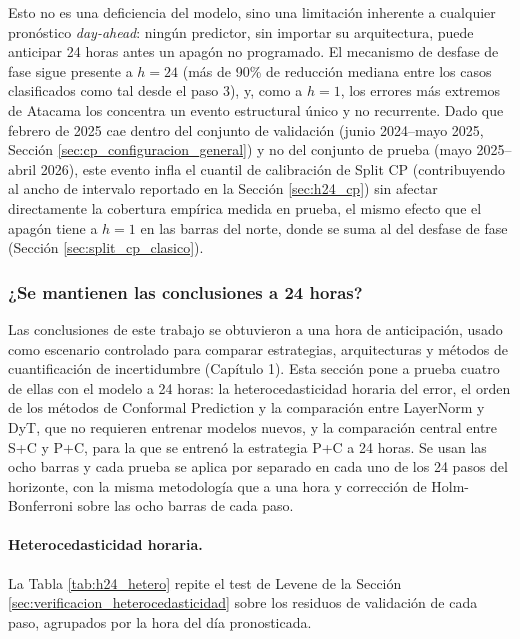 Esto no es una deficiencia del modelo, sino una limitación inherente a cualquier pronóstico \textit{day-ahead}: ningún predictor, sin importar su arquitectura, puede anticipar 24 horas antes un apagón no programado. El mecanismo de desfase de fase sigue presente a $h=24$ (más de 90\% de reducción mediana entre los casos clasificados como tal desde el paso 3), y, como a $h=1$, los errores más extremos de Atacama los concentra un evento estructural único y no recurrente. Dado que febrero de 2025 cae dentro del conjunto de validación (junio 2024--mayo 2025, Sección \ref{sec:cp_configuracion_general}) y no del conjunto de prueba (mayo 2025--abril 2026), este evento infla el cuantil de calibración de Split CP (contribuyendo al ancho de intervalo reportado en la Sección \ref{sec:h24_cp}) sin afectar directamente la cobertura empírica medida en prueba, el mismo efecto que el apagón tiene a $h=1$ en las barras del norte, donde se suma al del desfase de fase (Sección \ref{sec:split_cp_clasico}).

\subsubsection{¿Se mantienen las conclusiones a 24 horas?}
\label{sec:h24_conclusiones}

Las conclusiones de este trabajo se obtuvieron a una hora de anticipación, usado como escenario controlado para comparar estrategias, arquitecturas y métodos de cuantificación de incertidumbre (Capítulo 1). Esta sección pone a prueba cuatro de ellas con el modelo a 24 horas: la heterocedasticidad horaria del error, el orden de los métodos de Conformal Prediction y la comparación entre LayerNorm y DyT, que no requieren entrenar modelos nuevos, y la comparación central entre S+C y P+C, para la que se entrenó la estrategia P+C a 24 horas. Se usan las ocho barras y cada prueba se aplica por separado en cada uno de los 24 pasos del horizonte, con la misma metodología que a una hora y corrección de Holm-Bonferroni sobre las ocho barras de cada paso.

\paragraph{Heterocedasticidad horaria.} La Tabla \ref{tab:h24_hetero} repite el test de Levene de la Sección \ref{sec:verificacion_heterocedasticidad} sobre los residuos de validación de cada paso, agrupados por la hora del día pronosticada.

